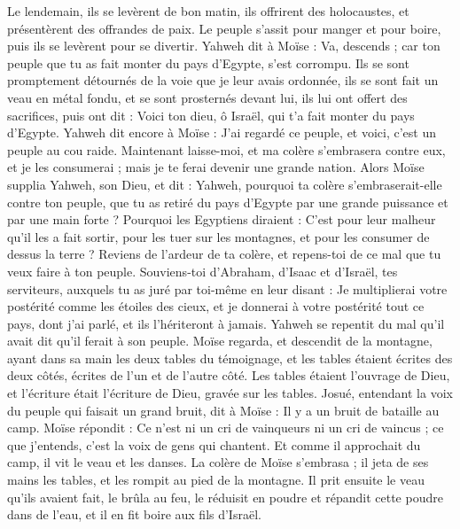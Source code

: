 \begin{multicols}{2}
Le lendemain, ils se levèrent de bon matin, ils offrirent des holocaustes, et présentèrent des offrandes de paix. Le peuple s'assit pour manger et pour boire, puis ils se levèrent pour se divertir.
Yahweh dit à Moïse : Va, descends ; car ton peuple que tu as fait monter du pays d'Egypte, s'est corrompu.
Ils se sont promptement détournés de la voie que je leur avais ordonnée, ils se sont fait un veau en métal fondu, et se sont prosternés devant lui, ils lui ont offert des sacrifices, puis ont dit : Voici ton dieu, ô Israël, qui t'a fait monter du pays d'Egypte.
Yahweh dit encore à Moïse : J'ai regardé ce peuple, et voici, c'est un peuple au cou raide.
Maintenant laisse-moi, et ma colère s'embrasera contre eux, et je les consumerai ; mais je te ferai devenir une grande nation.
Alors Moïse supplia Yahweh, son Dieu, et dit : Yahweh, pourquoi ta colère s'embraserait-elle contre ton peuple, que tu as retiré du pays d'Egypte par une grande puissance et par une main forte ?
Pourquoi les Egyptiens diraient : C’est pour leur malheur qu’il les a fait sortir, pour les tuer sur les montagnes, et pour les consumer de dessus la terre ? Reviens de l'ardeur de ta colère, et repens-toi de ce mal que tu veux faire à ton peuple.
Souviens-toi d'Abraham, d'Isaac et d'Israël, tes serviteurs, auxquels tu as juré par toi-même en leur disant : Je multiplierai votre postérité comme les étoiles des cieux, et je donnerai à votre postérité tout ce pays, dont j'ai parlé, et ils l'hériteront à jamais.
Yahweh se repentit du mal qu'il avait dit qu'il ferait à son peuple.
Moïse regarda, et descendit de la montagne, ayant dans sa main les deux tables du témoignage, et les tables étaient écrites des deux côtés, écrites de l’un et de l’autre côté.
Les tables étaient l'ouvrage de Dieu, et l'écriture était l'écriture de Dieu, gravée sur les tables.
Josué, entendant la voix du peuple qui faisait un grand bruit, dit à Moïse : Il y a un bruit de bataille au camp.
Moïse répondit : Ce n’est ni un cri de vainqueurs ni un cri de vaincus ; ce que j’entends, c’est la voix de gens qui chantent.
Et comme il approchait du camp, il vit le veau et les danses. La colère de Moïse s'embrasa ; il jeta de ses mains les tables, et les rompit au pied de la montagne.
Il prit ensuite le veau qu'ils avaient fait, le brûla au feu, le réduisit en poudre et répandit cette poudre dans de l'eau, et il en fit boire aux fils d'Israël.

\end{multicols}
